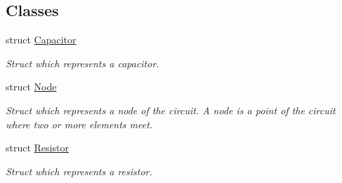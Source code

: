 \subsection*{Classes}
\begin{DoxyCompactItemize}
\item 
struct \hyperlink{structSpefNetISPD2013_1_1Capacitor}{Capacitor}
\begin{DoxyCompactList}\small\item\em Struct which represents a capacitor. \end{DoxyCompactList}\item 
struct \hyperlink{structSpefNetISPD2013_1_1Node}{Node}
\begin{DoxyCompactList}\small\item\em Struct which represents a node of the circuit. A node is a point of the circuit where two or more elements meet. \end{DoxyCompactList}\item 
struct \hyperlink{structSpefNetISPD2013_1_1Resistor}{Resistor}
\begin{DoxyCompactList}\small\item\em Struct which represents a resistor. \end{DoxyCompactList}\end{DoxyCompactItemize}
